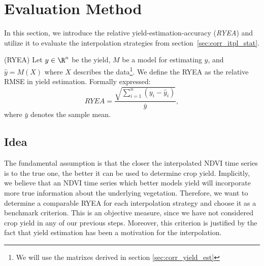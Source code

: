 \section{Evaluation Method}{
    \label{sec:ndvi_corr_eval}
    In this section, we introduce the relative yield-estimation-accuracy (\textit{RYEA}) and utilize it to evaluate the interpolation strategies from section~\ref{sec:corr_itpl_stat}. 

    \begin{definition}(RYEA) \label{def:ryea}
        Let $y\in \R^n$ be the yield, $M$ be a model for estimating $y$, and $\hat y = M(X)$ where $X$ describes the data\footnote{We will use the matrixes derived in section \ref{sec:corr_yield_est}}. 
        We define the RYEA as the relative RMSE in yield estimation. Formally expressed:
        \begin{equation}
            RYEA = \frac{\sqrt{\sum_{i=1}^n(y_i - \hat y_i)}}{\bar y}, %
        \end{equation}
        where $\bar y$ denotes the sample mean.
    \end{definition}

    \subsection{Idea}{
        The fundamental assumption is that the closer the interpolated NDVI time series is to the true one, the better it can be used to determine crop yield. Implicitly, we believe that an NDVI time series which better models yield will incorporate more true information about the underlying vegetation. 
        Therefore, we want to determine a comparable RYEA for each interpolation strategy and choose it as a benchmark criterion. 
        This is an objective measure, since we have not considered crop yield in any of our previous steps. Moreover, this criterion is justified by the fact that yield estimation has been a motivation for the interpolation.
    }

}
